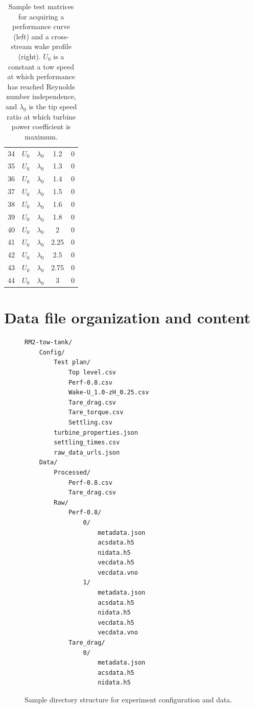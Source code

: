 \documentclass[12pt,letterpaper]{scrreprt}
\begin{document}
\begin{appendices}
\begin{table}[!ht]
{\begin{tabular}{c|c|c|c|c}
34  & $U_0$        & $\lambda_0$ & 1.2   & 0   \\
35  & $U_0$        & $\lambda_0$ & 1.3   & 0   \\
36  & $U_0$        & $\lambda_0$ & 1.4   & 0   \\
37  & $U_0$        & $\lambda_0$ & 1.5   & 0   \\
38  & $U_0$        & $\lambda_0$ & 1.6   & 0   \\
39  & $U_0$        & $\lambda_0$ & 1.8   & 0   \\
40  & $U_0$        & $\lambda_0$ & 2     & 0   \\
41  & $U_0$        & $\lambda_0$ & 2.25  & 0   \\
42  & $U_0$        & $\lambda_0$ & 2.5   & 0   \\
43  & $U_0$        & $\lambda_0$ & 2.75  & 0   \\
44  & $U_0$        & $\lambda_0$ & 3     & 0  
\end{tabular}}
\caption{Sample test matrices for acquiring a performance curve (left) and a
cross-stream wake profile (right). $U_0$ is a constant a tow speed at which
performance has reached Reynolds number independence, and $\lambda_0$ is the tip
speed ratio at which turbine power coefficient is maximum.}
\label{tab-test_section}
\end{table}


\chapter{Data file organization and content}

\begin{figure}
\begin{verbatim}
RM2-tow-tank/
    Config/
        Test plan/
            Top level.csv
            Perf-0.8.csv
            Wake-U_1.0-zH_0.25.csv
            Tare_drag.csv
            Tare_torque.csv
            Settling.csv
        turbine_properties.json
        settling_times.csv
        raw_data_urls.json
    Data/
        Processed/
            Perf-0.8.csv
            Tare_drag.csv
        Raw/
            Perf-0.8/
                0/
                    metadata.json
                    acsdata.h5
                    nidata.h5
                    vecdata.h5
                    vecdata.vno
                1/    
                    metadata.json
                    acsdata.h5
                    nidata.h5
                    vecdata.h5
                    vecdata.vno
            Tare_drag/
                0/
                    metadata.json
                    acsdata.h5
                    nidata.h5
\end{verbatim}
\caption{Sample directory structure for experiment configuration and data.}
\label{fig-dir_structure}
\end{figure}


\end{appendices}
\end{document}
